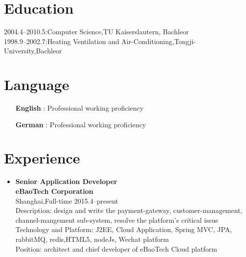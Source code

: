 \documentclass[a4paper,11pt]{res}
\begin{document}
 

\address{\bf  Permanent Address\\Donglu Lu 1350 Nong 21 Hao 501 Shi\\201206 Shanghai\\0086-18101890138\\klose911@googlemail.com}

\begin{resume}

  \section{Education}          
  2004.4--2010.5:\hfill Computer Science,TU Kaiserslautern, Bachleor\\
  1998.9--2002.7:\hfill Heating Ventilation and Air-Conditioning,Tongji-University,Bachleor

  \section{Language}
  \begin{itemize}
  \item[{\bf English}]: \hfill Professional working proficiency
  \item[{\bf German}]: \hfill Professional working proficiency
  \end{itemize}

  \section{Experience}

  \begin{itemize}
  \item{\bf Senior Application Developer}\\ {\bf eBaoTech Corporation}\\ Shanghai,Full-time \hfill 2015.4--present\\
    Description: design and write the payment-gateway,
    customer-management, channel-mangement sub-system,
    resolve the platform's critical issue \\  
    Technology and Platform: J2EE, Cloud Application, Spring
    MVC, JPA, rabbitMQ, redis,HTML5, nodeJs, Wechat platform  \\
    Position: architect and chief developer of eBaoTech Cloud platform \\


\end{itemize}
\end{resume}
\end{document}
